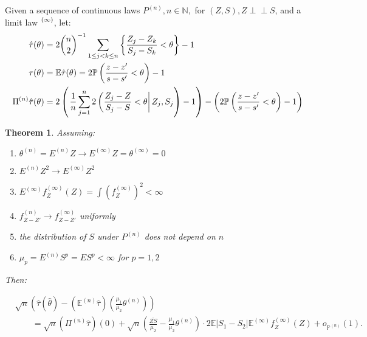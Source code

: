 \documentclass[12pt]{article}
\newtheorem{theorem}{Theorem}
\newcommand{\ind}{\perp \!\!\! \perp}
\newcommand{\z}{Z}
\newcommand{\s}{S}
\let\n\relax
\newcommand{\n}[1]{{#1}^{(n)}}
\newcommand{\iinfty}[1]{{#1}^{(\infty)}}
\newcommand{\Pin}{\Pi^{(n)}}
\newcommand{\En}{E^{(n)}}
\newcommand{\Einf}{E^{(\infty)}}
\newcommand{\EE}{\mathbb{E}}
\newcommand{\EEn}{\mathbb{E}^{(n)}}
\newcommand{\EEinf}{\mathbb{E}^{(\infty)}}
\newcommand{\Pn}{P^{(n)}}
\newcommand{\PP}{\mathbb{P}}
\newcommand{\PPn}{\mathbb{P}^{(n)}}
\newcommand{\thetan}{\theta^{(n)}}
\let\P\relax
\newcommand{\P}{P}
\newcommand{\E}{E}
\begin{document}


Given a sequence of continuous laws $\Pn,n\in\mathbb{N},$ for $(\z,\s), \z\ind\s$, and a limit law $\P^{(\infty)}$, let:
\begin{align}
  \hat\tau(\theta) &=2{n\choose 2}^{-1}\sum_{1\le j<k\le n}\left\{\frac{\z_j-\z_k}{\s_j-\s_k}<\theta\right\}-1\\
  \tau(\theta) &= \n{\EE}\hat\tau(\theta)=2\n{\PP}\left(\frac{z-z'}{s-s'}<\theta\right)-1\\
  \Pin\hat\tau(\theta) &= 2\left(\left.\frac{1}{n}\sum_{j=1}^n2\n{\P}\left(\frac{\z_j-\z}{\s_j-\s}<\theta\right|\z_j,\s_j\right)-1\right) - \left(2\n{\PP}\left(\frac{z-z'}{s-s'}<\theta\right)-1\right)
\end{align}
\begin{theorem}
Assuming:
\begin{enumerate}
\item $\thetan = \En\z \to \Einf\z=\theta^{(\infty)}=0$
\item $  \En\z^2 \to \Einf\z^2$
  \item $\iinfty{\E}\iinfty{f}_\z(\z)=\int \left(\iinfty{f}_\z\right)^2<\infty$
\item $f_{\z-\z'}^{(n)} \to   f_{\z-\z'}^{(\infty)}$ uniformly
\item the distribution of $\s$ under $\Pn$ does not depend on $n$
  \item $\mu_p=\En\s^p=\E\s^p<\infty$ for $p=1,2$
\end{enumerate}


Then:

\begin{align}
  &\sqrt{n}\left(\hat\tau(\hat\theta) - (\EEn\hat\tau)\left(\frac{\mu_1}{\mu_2}\thetan\right)\right) \\
  &\qquad = \sqrt{n}(\Pin\hat\tau)(0)
  + \sqrt{n}\left(\frac{\overline{\z\s}}{\mu_2}-\frac{\mu_1}{\mu_2}\thetan\right)\cdot 2 \EE|\s_1-\s_2|\EEinf f_{\z}^{(\infty)}(\z) + o_{\PPn}(1).
\end{align}
\end{theorem}
\end{document}
